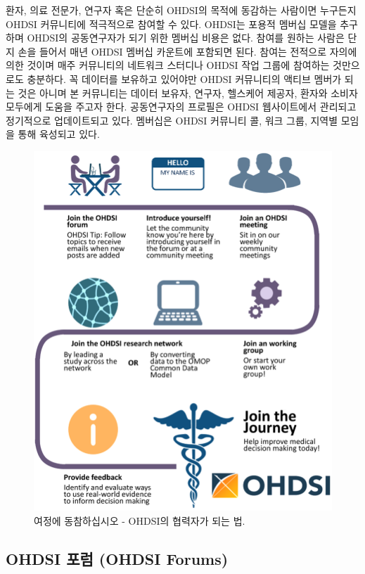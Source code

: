 \documentclass[11pt]{book}
\theoremstyle{definition}
\theoremstyle{definition}
\theoremstyle{definition}
\theoremstyle{remark}
\begin{document}
환자, 의료 전문가, 연구자 혹은 단순히 OHDSI의 목적에 동감하는 사람이면
누구든지 OHDSI 커뮤니티에 적극적으로 참여할 수 있다. OHDSI는 포용적
멤버십 모델을 추구하며 OHDSI의 공동연구자가 되기 위한 멤버십 비용은
없다. 참여를 원하는 사람은 단지 손을 들어서 매년 OHDSI 멤버십 카운트에
포함되면 된다. 참여는 전적으로 자의에 의한 것이며 매주 커뮤니티의
네트워크 스터디나 OHDSI 작업 그룹에 참여하는 것만으로도 충분하다. 꼭
데이터를 보유하고 있어야만 OHDSI 커뮤니티의 액티브 멤버가 되는 것은
아니며 본 커뮤니티는 데이터 보유자, 연구자, 헬스케어 제공자, 환자와
소비자 모두에게 도움을 주고자 한다. 공동연구자의 프로필은 OHDSI
웹사이트에서 관리되고 정기적으로 업데이트되고 있다. 멤버십은 OHDSI
커뮤니티 콜, 워크 그룹, 지역별 모임을 통해 육성되고 있다.
  

\begin{figure}

{\centering \includegraphics[width=0.9\linewidth]{images/WhereToBegin/joinTheJourney} 

}

\caption{여정에 동참하십시오 - OHDSI의 협력자가 되는 법.}\label{fig:jointhejourney}
\end{figure}

\subsection{OHDSI 포럼 (OHDSI Forums)}\label{ohdsi--ohdsi-forums}
\end{document}
